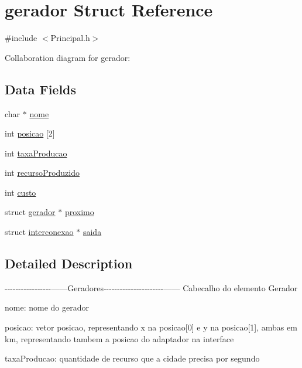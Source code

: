 \hypertarget{structgerador}{\section{gerador Struct Reference}
\label{structgerador}
}


{\ttfamily \#include $<$Principal.\-h$>$}



Collaboration diagram for gerador\-:
\subsection*{Data Fields}
\begin{DoxyCompactItemize}
\item 
char $\ast$ \hyperlink{structgerador_ae2a0f66178bb1c4d42e2b70ec9426ccb}{nome}
\item 
int \hyperlink{structgerador_a7e30d633898517077a4363ad6fade5b6}{posicao} \mbox{[}2\mbox{]}
\item 
int \hyperlink{structgerador_ac6d5c20bc66b992b34eaa1ab7bb1d813}{taxa\-Producao}
\item 
int \hyperlink{structgerador_a9e29959680201391763bfe25c54d3e7a}{recurso\-Produzido}
\item 
int \hyperlink{structgerador_a420b800f5434e6488ebc8a2b81d3b74b}{custo}
\item 
struct \hyperlink{structgerador}{gerador} $\ast$ \hyperlink{structgerador_afc2cefcafa0e3935e9e7641ef91e6b2d}{proximo}
\item 
struct \hyperlink{structinterconexao}{interconexao} $\ast$ \hyperlink{structgerador_aafa87c2fb8e43c550b83e0f109c2b7e5}{saida}
\end{DoxyCompactItemize}


\subsection{Detailed Description}
-\/-\/-\/-\/-\/-\/-\/-\/-\/-\/-\/-\/-\/-\/-\/-\/-\/------Geradores-\/-\/-\/-\/-\/-\/-\/-\/-\/-\/-\/-\/-\/-\/-\/-\/-\/-\/-\/-\/-\/-\/------ Cabecalho do elemento Gerador

nome\-: nome do gerador

posicao\-: vetor posicao, representando x na posicao\mbox{[}0\mbox{]} e y na posicao\mbox{[}1\mbox{]}, ambas em km, representando tambem a posicao do adaptador na interface

taxa\-Producao\-: quantidade de recurso que a cidade precisa por segundo


